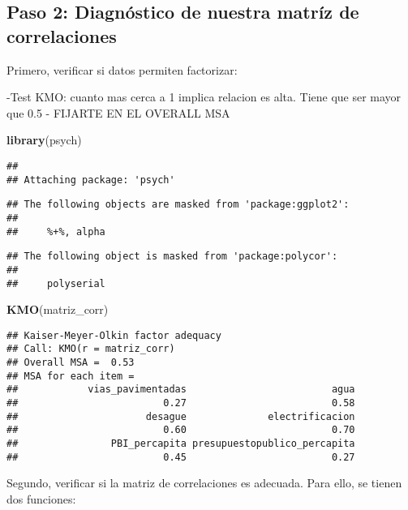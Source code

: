 \documentclass[
]{article}
\newenvironment{Shaded}{\begin{snugshade}}{\end{snugshade}}
\newcommand{\KeywordTok}[1]{\textcolor[rgb]{0.13,0.29,0.53}{\textbf{#1}}}
\newcommand{\NormalTok}[1]{#1}
\begin{document}
\hypertarget{paso-2-diagnuxf3stico-de-nuestra-matruxedz-de-correlaciones}{%
\subsection{Paso 2: Diagnóstico de nuestra matríz de
correlaciones}\label{paso-2-diagnuxf3stico-de-nuestra-matruxedz-de-correlaciones}}

Primero, verificar si datos permiten factorizar:

-Test KMO: cuanto mas cerca a 1 implica relacion es alta. Tiene que ser
mayor que 0.5 - FIJARTE EN EL OVERALL MSA

\begin{Shaded}
\begin{Highlighting}[]
\KeywordTok{library}\NormalTok{(psych)}
\end{Highlighting}
\end{Shaded}

\begin{verbatim}
## 
## Attaching package: 'psych'
\end{verbatim}

\begin{verbatim}
## The following objects are masked from 'package:ggplot2':
## 
##     %+%, alpha
\end{verbatim}

\begin{verbatim}
## The following object is masked from 'package:polycor':
## 
##     polyserial
\end{verbatim}

\begin{Shaded}
\begin{Highlighting}[]
\KeywordTok{KMO}\NormalTok{(matriz_corr) }
\end{Highlighting}
\end{Shaded}

\begin{verbatim}
## Kaiser-Meyer-Olkin factor adequacy
## Call: KMO(r = matriz_corr)
## Overall MSA =  0.53
## MSA for each item = 
##            vias_pavimentadas                         agua 
##                         0.27                         0.58 
##                      desague              electrificacion 
##                         0.60                         0.70 
##                PBI_percapita presupuestopublico_percapita 
##                         0.45                         0.27
\end{verbatim}

Segundo, verificar si la matriz de correlaciones es adecuada. Para ello,
se tienen dos funciones:
\end{document}

